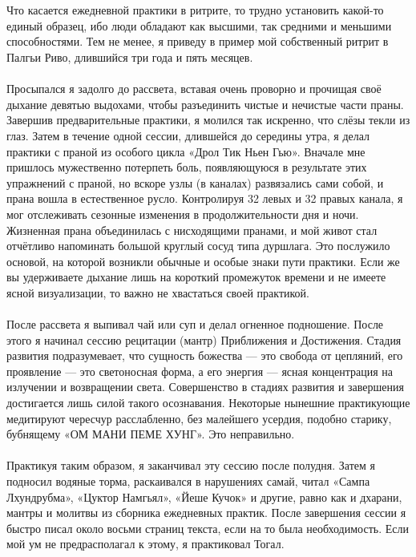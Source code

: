 \\ \\ Что касается ежедневной практики в ритрите, то трудно установить какой-то единый образец, ибо люди обладают как высшими, так средними и меньшими способностями. Тем не менее, я приведу в пример мой собственный ритрит в Палгьи Риво, длившийся три года и пять месяцев.
\newpage
\\ \\ Просыпался я задолго до рассвета, вставая очень проворно и прочищая своё дыхание девятью выдохами, чтобы разъединить чистые и нечистые части праны. Завершив предварительные практики, я молился так искренно, что слёзы текли из глаз. Затем в течение одной сессии, длившейся до середины утра, я делал практики с праной из особого цикла «Дрол Тик Ньен Гью». Вначале мне пришлось мужественно потерпеть боль, появляющуюся в результате этих упражнений с праной, но вскоре узлы (в каналах) развязались сами собой, и прана вошла в естественное русло. Контролируя 32 левых и 32 правых канала, я мог отслеживать сезонные изменения в продолжительности дня и ночи. Жизненная прана объединилась с нисходящими пранами, и мой живот стал отчётливо напоминать большой круглый сосуд типа дуршлага. Это послужило основой, на которой возникли обычные и особые знаки пути практики. Если же вы удерживаете дыхание лишь на короткий промежуток времени и не имеете ясной визуализации, то важно не хвастаться своей практикой.
\\ \\ После рассвета я выпивал чай или суп и делал огненное подношение. После этого я начинал сессию рецитации (мантр) Приближения и Достижения. Стадия развития подразумевает, что сущность божества — это свобода от цепляний, его проявление — это светоносная форма, а его энергия — ясная концентрация на излучении и возвращении света. Совершенство в стадиях развития и завершения достигается лишь силой такого осознавания. Некоторые нынешние практикующие медитируют чересчур расслабленно, без малейшего усердия, подобно старику, бубнящему «ОМ МАНИ ПЕМЕ ХУНГ». Это неправильно.
\newpage
\\ \\ Практикуя таким образом, я заканчивал эту сессию после полудня. Затем я подносил водяные торма, раскаивался в нарушениях самай, читал «Сампа Лхундрубма», «Цуктор Намгьял», «Йеше Кучок» и другие, равно как и дхарани, мантры и молитвы из сборника ежедневных практик. После завершения сессии я быстро писал около восьми страниц текста, если на то была необходимость. Если мой ум не предрасполагал к этому, я практиковал Тогал.

